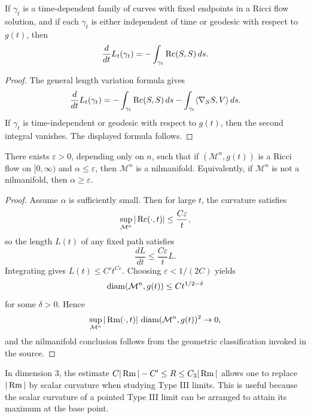 \begin{corollary}
\label{ch08-cor-length-under-ricci-flow}
If \(\gamma_t\) is a time-dependent family of curves with fixed endpoints in a Ricci flow solution, and if each \(\gamma_t\) is either independent of time or geodesic with respect to \(g(t)\), then
\[
\frac{d}{dt}L_t(\gamma_t)=-\int_{\gamma_t}\operatorname{Rc}(S,S)\,ds.
\]
\end{corollary}

\begin{proof}
The general length variation formula gives
\[
\frac{d}{dt}L_t(\gamma_t)
= -\int_{\gamma_t}\operatorname{Rc}(S,S)\,ds
- \int_{\gamma_t}\langle \nabla_S S,V\rangle\,ds.
\]
If \(\gamma_t\) is time-independent or geodesic with respect to \(g(t)\), then the second integral vanishes. The displayed formula follows.
\end{proof}

\begin{proposition}
\label{ch08-prop-type-iii-lower-bound}
There exists \(\varepsilon>0\), depending only on \(n\), such that if \((\mathcal M^n,g(t))\) is a Ricci flow on \([0,\infty)\) and \(\alpha\le\varepsilon\), then \(\mathcal M^n\) is a nilmanifold. Equivalently, if \(\mathcal M^n\) is not a nilmanifold, then \(\alpha\ge\varepsilon\).
\end{proposition}

\begin{proof}
Assume \(\alpha\) is sufficiently small. Then for large \(t\), the curvature satisfies
\[
\sup_{\mathcal M^n}|\operatorname{Rc}(\cdot,t)|\le \frac{C\varepsilon}{t},
\]
so the length \(L(t)\) of any fixed path satisfies
\[
\frac{dL}{dt}\le \frac{C\varepsilon}{t}L.
\]
Integrating gives \(L(t)\le C' t^{C\varepsilon}\). Choosing \(\varepsilon<1/(2C)\) yields
\[
\operatorname{diam}(\mathcal M^n,g(t))\le Ct^{1/2-\delta}
\]
for some \(\delta>0\). Hence
\[
\sup_{\mathcal M^n}|\operatorname{Rm}(\cdot,t)|\,\operatorname{diam}(\mathcal M^n,g(t))^2\to0,
\]
and the nilmanifold conclusion follows from the geometric classification invoked in the source.
\end{proof}

\begin{remark}
\label{ch08-rem-type-iii-limits}
In dimension \(3\), the estimate \(C|\operatorname{Rm}|-C'\le R\le C_3|\operatorname{Rm}|\) allows one to replace \(|\operatorname{Rm}|\) by scalar curvature when studying Type III limits. This is useful because the scalar curvature of a pointed Type III limit can be arranged to attain its maximum at the base point.
\end{remark}

